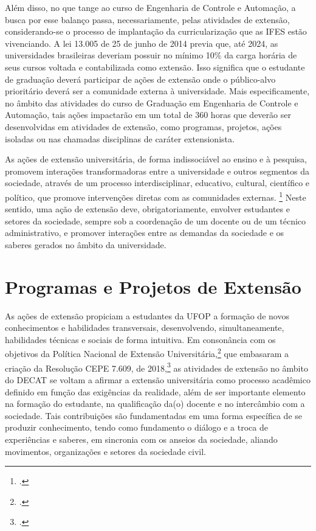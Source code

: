 \documentclass[
	12pt,				%
	openright,			%
	oneside,			%
	a4paper,			%
	english,			%
	brazil				%
	]{abntex2}
\begin{document}
Além disso, no que tange ao curso de Engenharia de Controle e Automação, a busca por esse balanço passa, necessariamente, pelas atividades de extensão, considerando-se o processo de implantação da curricularização que as IFES estão vivenciando. A lei 13.005 de 25 de junho de 2014 previa que, até 2024, as universidades brasileiras deveriam possuir no mínimo 10\% da carga horária de seus cursos voltada e contabilizada como extensão. Isso significa que o estudante de graduação deverá participar de ações de extensão onde o público-alvo prioritário deverá ser a comunidade externa à universidade. Mais especificamente, no âmbito das atividades do curso de Graduação em Engenharia de Controle e Automação, tais ações impactarão em um total de 360 horas que deverão ser desenvolvidas em atividades de extensão, como programas, projetos, ações isoladas ou nas chamadas disciplinas de caráter extensionista.

As ações de extensão universitária, de forma indissociável ao ensino e à pesquisa, promovem interações transformadoras entre a universidade e outros segmentos da sociedade, através de um processo interdisciplinar, educativo, cultural, científico e político, que promove intervenções diretas com as comunidades externas. \footcite{guia-curricularizacao-2022} Neste sentido, uma ação de extensão deve, obrigatoriamente, envolver estudantes e setores da sociedade, sempre sob a coordenação de um docente ou de um técnico administrativo, e promover interações entre as demandas da sociedade e os saberes gerados no âmbito da universidade.


\section{Programas e Projetos de Extensão}
As ações de extensão propiciam a estudantes da UFOP a formação de novos conhecimentos e habilidades transversais, desenvolvendo, simultaneamente, habilidades técnicas e sociais de forma intuitiva. Em consonância com os objetivos da Política Nacional de Extensão Universitária,\footcite{forproex2012} que embasaram a criação da Resolução CEPE 7.609, de 2018,\footcite[][]{resolucao-cepe-7609} as atividades de extensão no âmbito do DECAT se voltam a afirmar a extensão universitária como processo acadêmico definido em função das exigências da realidade, além de ser importante elemento na formação do estudante, na qualificação da(o) docente e no intercâmbio com a sociedade. Tais contribuições são fundamentadas em uma forma específica de se produzir conhecimento, tendo como fundamento o  diálogo e a troca de experiências e saberes, em sincronia com os anseios da sociedade, aliando movimentos, organizações e setores da sociedade civil.
\end{document}
